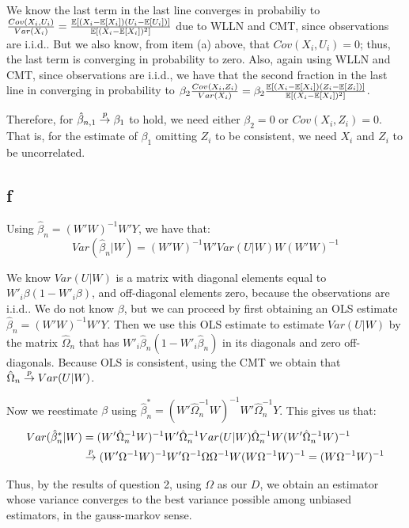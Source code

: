 \documentclass[12pt]{paper}
\begin{document}
We know the last term in the last line converges in probabiliy to $\frac{Cov(X_i,U_i)}{Var(X_i)}=\frac{\mathbb{E} \left [ (X_i-\mathbb{E} \left [ X_i \right ])(U_i-\mathbb{E} \left [ U_i \right ]) \right ]}{\mathbb{E} \left [ (X_i-\mathbb{E} \left [ X_i \right ])^2 \right ]}$ due to WLLN and CMT, since observations are i.i.d.. But we also know, from item (a) above, that $Cov(X_i,U_i)=0$; thus, the last term is converging in probability to zero. Also, again using WLLN and CMT, since observations are i.i.d., we have that the second fraction in the last line in converging in probability to $\beta_2\frac{Cov(X_i,Z_i)}{Var(X_i)}=\beta_2\frac{\mathbb{E} \left [ (X_i-\mathbb{E} \left [ X_i \right ])(Z_i-\mathbb{E} \left [ Z_i \right ]) \right ]}{\mathbb{E} \left [ (X_i-\mathbb{E} \left [ X_i \right ])^2 \right ]}$.

Therefore, for $\hat{\beta}_{n,1}\overset{p}{\to}\beta_1$ to hold, we need either $\beta_2=0$ or $Cov(X_i,Z_i)=0$. That is, for the estimate of $\beta_1$ omitting $Z_i$ to be consistent, we need $X_i$ and $Z_i$ to be uncorrelated.

\subsection*{f}

Using $\hat{\beta}_n=(W'W)^{-1}W'Y$, we have that:
\begin{equation}
Var(\hat{\beta}_n|W)=(W'W)^{-1}W'Var(U|W)W(W'W)^{-1}
\end{equation}

We know $Var(U|W)$ is a matrix with diagonal elements equal to $W'_i\beta(1-W'_i\beta)$, and off-diagonal elements zero, because the observations are i.i.d.. We do not know $\beta$, but we can proceed by first obtaining an OLS estimate $\hat{\beta}_n=(W'W)^{-1}W'Y$. Then we use this OLS estimate to estimate $Var(U|W)$ by the matrix $\hat{\Omega}_n$ that has $W'_i\hat{\beta}_n(1-W'_i\hat{\beta}_n)$ in its diagonals and zero off-diagonals. Because OLS is consistent, using the CMT we obtain that $\hat{\Omega}_n\overset{p}{\to} Var(U|W)$.

Now we reestimate $\beta$ using $\hat{\beta}_n^{*}=(W'\hat{\Omega}_n^{-1}W)^{-1}W'\hat{\Omega}_n^{-1}Y$. This gives us that:
\begin{equation}
\begin{split}
Var(\hat{\beta}_n^{*}|W)&=(W'\hat{\Omega}_n^{-1}W)^{-1}W'\hat{\Omega}_n^{-1}Var(U|W)\hat{\Omega}_n^{-1}W(W'\hat{\Omega}_n^{-1}W)^{-1}\\
&\overset{p}{\to} (W'\Omega^{-1}W)^{-1}W'\Omega^{-1}\Omega\Omega^{-1}W(W\Omega^{-1}W)^{-1}=(W\Omega^{-1}W)^{-1}
\end{split}
\end{equation}

Thus, by the results of question 2, using $\Omega$ as our $D$, we obtain an estimator whose variance converges to the best variance possible among unbiased estimators, in the gauss-markov sense.
\end{document}
